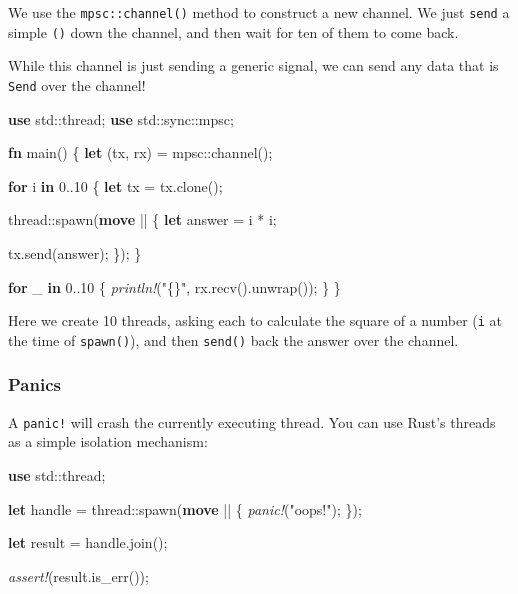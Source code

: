 \documentclass[a4paper,]{book}
\newenvironment{Shaded}{\begin{snugshade}}{\end{snugshade}}
\newcommand{\KeywordTok}[1]{\textcolor[rgb]{0.13,0.29,0.53}{\textbf{{#1}}}}
\newcommand{\DecValTok}[1]{\textcolor[rgb]{0.00,0.00,0.81}{{#1}}}
\newcommand{\StringTok}[1]{\textcolor[rgb]{0.31,0.60,0.02}{{#1}}}
\newcommand{\PreprocessorTok}[1]{\textcolor[rgb]{0.56,0.35,0.01}{\textit{{#1}}}}
\newcommand{\NormalTok}[1]{{#1}}
\begin{document}
We use the \texttt{mpsc::channel()} method to construct a new channel.
We just \texttt{send} a simple \texttt{()} down the channel, and then
wait for ten of them to come back.

While this channel is just sending a generic signal, we can send any
data that is \texttt{Send} over the channel!

\begin{Shaded}
\begin{Highlighting}[]
\KeywordTok{use} \NormalTok{std::thread;}
\KeywordTok{use} \NormalTok{std::sync::mpsc;}

\KeywordTok{fn} \NormalTok{main() \{}
    \KeywordTok{let} \NormalTok{(tx, rx) = mpsc::channel();}

    \KeywordTok{for} \NormalTok{i }\KeywordTok{in} \DecValTok{0.}\NormalTok{.}\DecValTok{10} \NormalTok{\{}
        \KeywordTok{let} \NormalTok{tx = tx.clone();}

        \NormalTok{thread::spawn(}\KeywordTok{move} \NormalTok{|| \{}
            \KeywordTok{let} \NormalTok{answer = i * i;}

            \NormalTok{tx.send(answer);}
        \NormalTok{\});}
    \NormalTok{\}}

    \KeywordTok{for} \NormalTok{_ }\KeywordTok{in} \DecValTok{0.}\NormalTok{.}\DecValTok{10} \NormalTok{\{}
        \PreprocessorTok{println!}\NormalTok{(}\StringTok{"\{\}"}\NormalTok{, rx.recv().unwrap());}
    \NormalTok{\}}
\NormalTok{\}}
\end{Highlighting}
\end{Shaded}

Here we create 10 threads, asking each to calculate the square of a
number (\texttt{i} at the time of \texttt{spawn()}), and then
\texttt{send()} back the answer over the channel.

\subsubsection{Panics}\label{panics}

A \texttt{panic!} will crash the currently executing thread. You can use
Rust's threads as a simple isolation mechanism:

\begin{Shaded}
\begin{Highlighting}[]
\KeywordTok{use} \NormalTok{std::thread;}

\KeywordTok{let} \NormalTok{handle = thread::spawn(}\KeywordTok{move} \NormalTok{|| \{}
    \PreprocessorTok{panic!}\NormalTok{(}\StringTok{"oops!"}\NormalTok{);}
\NormalTok{\});}

\KeywordTok{let} \NormalTok{result = handle.join();}

\PreprocessorTok{assert!}\NormalTok{(result.is_err());}
\end{Highlighting}
\end{Shaded}
\end{document}
